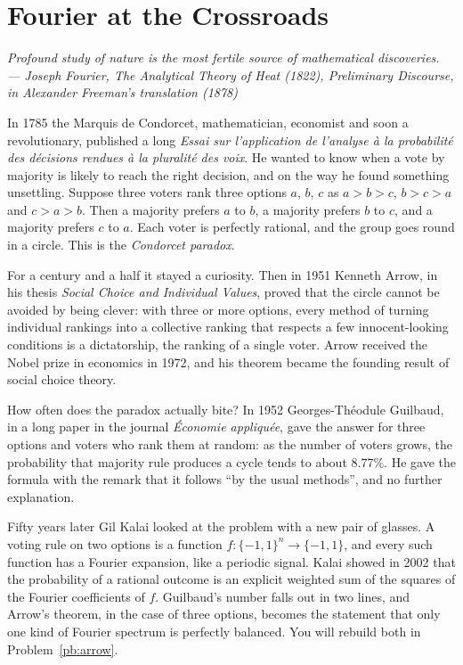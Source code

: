 \chapter{Fourier at the Crossroads}

\begin{center}\itshape
Profound study of nature is the most fertile source of mathematical discoveries.\\
\upshape --- Joseph Fourier, \emph{The Analytical Theory of Heat} (1822), Preliminary Discourse, in Alexander Freeman's translation (1878)
\end{center}

In 1785 the Marquis de Condorcet, mathematician, economist and soon a revolutionary, published a long \emph{Essai sur l'application
de l'analyse à la probabilité des décisions rendues à la pluralité des voix}. He wanted to know when a vote by majority is likely to
reach the right decision, and on the way he found something unsettling. Suppose three voters rank three options $a$, $b$, $c$ as
$a>b>c$, $b>c>a$ and $c>a>b$. Then a majority prefers $a$ to $b$, a majority prefers $b$ to $c$, and a majority prefers $c$ to $a$.
Each voter is perfectly rational, and the group goes round in a circle. This is the \emph{Condorcet paradox}.

For a century and a half it stayed a curiosity. Then in 1951 Kenneth Arrow, in his thesis \emph{Social Choice and Individual
Values}, proved that the circle cannot be avoided by being clever: with three or more options, every method of turning individual
rankings into a collective ranking that respects a few innocent-looking conditions is a dictatorship, the ranking of a single
voter. Arrow received the Nobel prize in economics in 1972, and his theorem became the founding result of social choice theory.

How often does the paradox actually bite? In 1952 Georges-Théodule Guilbaud, in a long paper in the journal \emph{Économie
appliquée}, gave the answer for three options and voters who rank them at random: as the number of voters grows, the probability
that majority rule produces a cycle tends to about $8.77\%$. He gave the formula with the remark that it follows ``by the usual
methods'', and no further explanation.

Fifty years later Gil Kalai looked at the problem with a new pair of glasses. A voting rule on two options is a function
$f:\{-1,1\}^n\to\{-1,1\}$, and every such function has a Fourier expansion, like a periodic signal. Kalai showed in 2002 that the
probability of a rational outcome is an explicit weighted sum of the squares of the Fourier coefficients of $f$. Guilbaud's number
falls out in two lines, and Arrow's theorem, in the case of three options, becomes the statement that only one kind of Fourier
spectrum is perfectly balanced. You will rebuild both in Problem~\ref{pb:arrow}.

